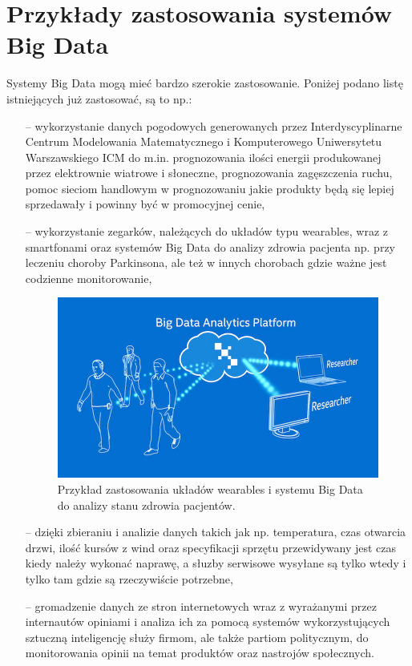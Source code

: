 \section{Przykłady zastosowania systemów Big Data}
Systemy Big Data mogą mieć bardzo szerokie zastosowanie. Poniżej podano listę istniejących już zastosować, są to np.:

\begin{itemize}
	\item[--] wykorzystanie danych pogodowych generowanych przez Interdyscyplinarne Centrum Modelowania Matematycznego i Komputerowego Uniwersytetu Warszawskiego ICM do m.in. prognozowania ilości energii produkowanej przez elektrownie wiatrowe i słoneczne, prognozowania zagęszczenia ruchu, pomoc sieciom handlowym w prognozowaniu jakie produkty będą się lepiej sprzedawały i powinny być w promocyjnej cenie, 
	\item[--] wykorzystanie zegarków, należących do układów typu wearables, wraz z smartfonami oraz systemów Big Data do analizy zdrowia pacjenta np. przy leczeniu choroby Parkinsona, ale też w innych chorobach gdzie ważne jest codzienne monitorowanie,

\begin{figure}[h] %
	\centering
	\includegraphics[width=0.6\linewidth]{img/big_data_intel_parkinson}
	\caption{Przykład zastosowania układów wearables i systemu Big Data do analizy stanu zdrowia pacjentów.}
\end{figure}

	\item[--] dzięki zbieraniu i analizie danych takich jak np. temperatura, czas otwarcia drzwi, ilość kursów z wind oraz specyfikacji sprzętu przewidywany jest czas kiedy należy wykonać naprawę, a słuzby serwisowe wysyłane są tylko wtedy i tylko tam gdzie są rzeczywiście potrzebne,
	\item[--] gromadzenie danych ze stron internetowych wraz z wyrażanymi przez internautów opiniami i analiza ich za pomocą systemów wykorzystujących sztuczną inteligencję służy firmom, ale także partiom politycznym, do monitorowania opinii na temat produktów oraz nastrojów społecznych.
	
\end{itemize}

